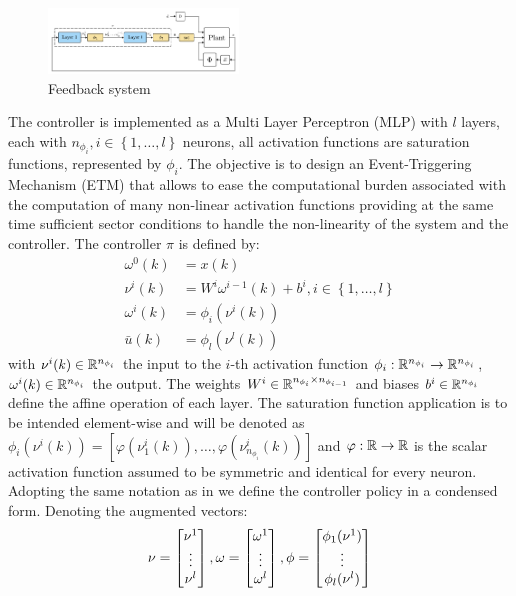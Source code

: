 \documentclass{ifacconf}
\theoremstyle{plain}
\begin{document}
\begin{figure}[H]
    \centering
    \includegraphics[width=0.45\textwidth]{Figures/first_scheme}
    \caption{Feedback system}
    \label{fig:first_scheme}
\end{figure}

The controller is implemented as a Multi Layer Perceptron (MLP) with $l$ layers, each with $n_{\phi_i}, i \in \left\{ 1, \dots, l\right\}$ neurons, all activation functions are saturation functions, represented by $\phi_i$. The objective is to design an Event-Triggering Mechanism (ETM) that allows to ease the computational burden associated with the computation of many non-linear activation functions providing at the same time sufficient sector conditions to handle the non-linearity of the system and the controller. The controller $\pi$ is defined by:
\begin{equation}\label{eq:nn-equations}
  \begin{aligned}
  \omega^{0}(k) &= x(k) \\
  \nu^{i}(k) &= W^{i} \omega^{i - 1}(k) + b^{i}, i \in \left\{ 1, \dots, l \right\}\\
  \omega^{i}(k) &= \phi_i(\nu^i(k))\\
  \bar{u}(k) &= \phi_l(\nu^l(k))
  \end{aligned} 
\end{equation}
with $\nu^i(k) \in {\mathbb{R}}^{n_{\phi_i}}$ the input to the $i$-th activation function $\phi_i: {\mathbb{R}}^{n_{\phi_i}} \to {\mathbb{R}}^{n_{\phi_i}}$, $\omega^i(k) \in {\mathbb{R}}^{n_{\phi_i}}$ the output. The weights $W^i \in {\mathbb{R}}^{n_{\phi_i} \times n_{\phi_{i-1}}}$ and biases $b^i \in {\mathbb{R}}^{n_{\phi_i}}$ define the affine operation of each layer. The saturation function application is to be intended element-wise and will be denoted as $\phi_i(\nu^i(k)) = \left[ \varphi(\nu^i_1(k)), \dots, \varphi(\nu^i_{n_{\phi_i}}(k)) \right]$ and $\varphi: {\mathbb{R}} \to {\mathbb{R}}$ is the scalar activation function assumed to be symmetric and identical for every neuron. Adopting the same notation as in \cite{css-paper} we define the controller policy in a condensed form. Denoting the augmented vectors:
\begin{equation*}
  \nu = \left[\begin{matrix}\nu^1 \\ \vdots \\ \nu^l\end{matrix}\right], \omega = \left[\begin{matrix}\omega^1 \\ \vdots \\ \omega^l\end{matrix}\right], \phi = \left[\begin{matrix}\phi_1(\nu^1) \\ \vdots \\ \phi_l(\nu^l)\end{matrix}\right] 
\end{equation*}
\end{document}
